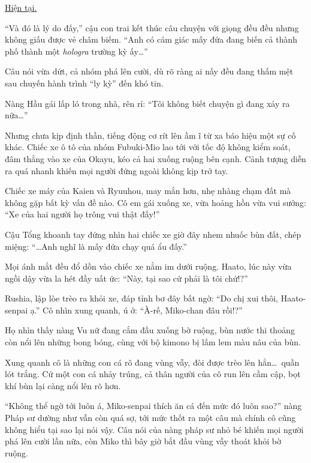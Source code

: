 \documentclass[../main.tex]{subfiles}
\begin{document}
\begin{center}
  \uline{Hiện tại.}
\end{center}

``Và đó là lý do đấy,'' cậu con trai kết thúc câu chuyện với giọng đều đều nhưng không giấu được vẻ châm biếm. ``Anh có cảm giác mấy đứa đang biến cả thành phố thành một \textit{hologra} trường kỳ ấy\dots ''

Câu nói vừa dứt, cả nhóm phá lên cười, dù rõ ràng ai nấy đều đang thấm mệt sau chuyến hành trình ``ly kỳ'' đến khó tin.

Nàng Hầu gái lấp ló trong nhà, rên rỉ: ``Tôi không biết chuyện gì đang xảy ra nữa\dots''

Nhưng chưa kịp định thần, tiếng động cơ rít lên ầm ĩ từ xa báo hiệu một sự cố khác. Chiếc xe ô tô của nhóm Fubuki-Mio lao tới với tốc độ không kiểm soát, đâm thẳng vào xe của Okayu, kéo cả hai xuống ruộng bên cạnh. Cảnh tượng diễn ra quá nhanh khiến mọi người đứng ngoài không kịp trở tay.

Chiếc xe máy của Kaien và Ryuuhou, may mắn hơn, nhẹ nhàng chạm đất mà không gặp bất kỳ vấn đề nào. Cô em gái xuống xe, vừa hoảng hồn vừa vui sướng: ``Xe của hai người họ trông vui thật đấy!''

Cậu Tổng khoanh tay đứng nhìn hai chiếc xe giờ đây nhem nhuốc bùn đất, chép miệng: ``\dots Anh nghĩ là mấy đứa chạy quá ẩu đấy.''

Mọi ánh mắt đều đổ dồn vào chiếc xe nằm im dưới ruộng. Haato, lúc này vừa ngồi dậy vừa la hét đầy uất ức: ``Này, tại sao cứ phải là tôi chứ!?''

Rushia, lập lòe trèo ra khỏi xe, đáp tỉnh bơ đây bất ngờ: ``Do chị xui thôi, Haato-senpai ạ.'' Cô nhìn xung quanh, ú ớ: ``À-rế, Miko-chan đâu rồi!?''

Họ nhìn thấy nàng Vu nữ đang cắm đầu xuống bờ ruộng, bùn nước thi thoảng còn nổi lên những bong bóng, cùng với bộ kimono bị lấm lem màu nâu của bùn.

Xung quanh cô là những con cá rô đang vùng vẫy, đòi được trèo lên hẳn\dots\ quần lót trắng. Cứ một con cá nhảy trúng, cả thân người của cô run lên cầm cập, bọt khí bùn lại càng nổi lên rõ hơn.

``Không thể ngờ tới luôn á, Miko-senpai thích ăn cá đến mức đó luôn sao?'' nàng Pháp sư dường như vẫn còn quá sợ, tới mức thốt ra một câu mà chính cô cũng không hiểu tại sao lại nói vậy. Câu nói của nàng pháp sư nhỏ bé khiến mọi người phá lên cười lần nữa, còn Miko thì bây giờ bắt đầu vùng vẫy thoát khỏi bờ ruộng.
\end{document}
